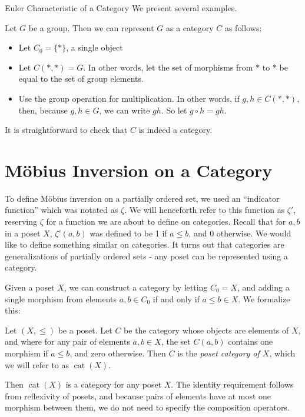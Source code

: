 \documentclass[12pt]{pom_thesis}
\DeclareMathOperator{\cat}{cat}
\begin{document}
\begin{chapter}{Euler Characteristic of a Category}
We present several examples.
\begin{examp}
Let $G$ be a group. Then we can represent $G$ as a category $C$ as follows: 
\begin{itemize}
\item Let $C_0 = \{*\}$, a single object
\item Let $C(*, *) = G$. In other words, let the set of morphisms from $*$ to $*$ be equal to the set of group elements. 
\item Use the group operation for multiplication. In other words, if $g,h \in C(*,*)$, then, because $g,h \in G$, we can write $gh$. So let $g \circ h = gh$. 
\end{itemize}
It is straightforward to check that $C$ is indeed a category. 
\end{examp}



\section{M\"obius Inversion on a Category}

To define M\"obius inversion on a partially ordered set, we used an ``indicator function'' which was notated as $\zeta$. We will henceforth refer to this function as $\zeta'$, reserving $\zeta$ for a function we are about to define on categories. Recall that for $a,b$ in a poset $X$, $\zeta'(a,b)$ was defined to be 1 if $a \leq b$, and 0 otherwise. We would like to define something similar on categories. It turns out that categories are generalizations of partially ordered sets - any poset can be represented using a category.

Given a poset $X$, we can construct a category by letting $C_0=X$, and adding a single morphism from elements $a,b \in C_0$ if and only if $a \leq b \in X$. We formalize this:

\begin{defn}\label{cat_poset}
Let $(X, \leq)$ be a poset. Let $C$ be the category whose objects are elements of $X$, and where for any pair of elements $a,b \in X$, the set $C(a,b)$ contains one morphism if $a \leq b$, and zero otherwise. Then $C$ is the \emph{poset category of $X$}, which we will refer to as $\cat(X)$.
\end{defn}
Then $\cat(X)$ is a category for any poset $X$. The identity requirement follows from reflexivity of posets, and because pairs of elements have at most one morphism between them, we do not need to specify the composition operators.


\end{chapter}
\end{document}
